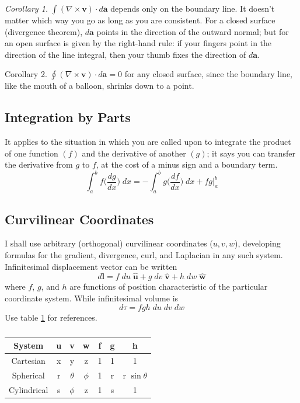 \documentclass[../main.tex]{subfiles}
\begin{document}
\emph{Corollary 1.} $\int (\nabla \times \mathbf{v})\cdot d\mathbf{a}$ depends only on the boundary line. It doesn't matter which way you go as long as you are consistent. For a closed surface (divergence theorem), $d\mathbf{a}$ points in the direction of the outward normal; but for an open surface is given by the right-hand rule: if your ﬁngers point in the direction of the line integral, then your thumb ﬁxes the direction of $d\mathbf{a}$.

Corollary 2. $\oint (\nabla \times \mathbf{v})\cdot d\mathbf{a}=0$ for any closed surface, since the boundary line, like the mouth of a balloon, shrinks down to a point.

\subsection*{Integration by Parts}
It applies to the situation in which you are called upon to integrate the product of one function $( f )$ and the derivative of another $(g)$; it says you can transfer the derivative from $g$ to $f$, at the cost of a minus sign and a boundary term.
\begin{equation*}
    \int_{a}^{b} f\bigg(\frac{dg}{dx}\bigg)\;dx=-\int_{a}^{b} g\bigg(\frac{df}{dx}\bigg)\;dx+ fg \bigg\lvert_{a}^{b}
\end{equation*}

\subsection*{Curvilinear Coordinates}
I shall use arbitrary (orthogonal) curvilinear coordinates ($u, v, w$), developing formulas for the gradient, divergence, curl, and Laplacian in any such system. Infinitesimal displacement vector can be written
\begin{equation*}
    d\mathbf{l}=f\;d u \;\mathbf{\hat{u}} +g \;d v \;\mathbf{\hat{v}}+h \;d w \;\mathbf{\hat{w}}
\end{equation*}
where $f$, $g$, and $h$ are functions of position characteristic of the particular coordinate system. While infinitesimal volume is
\begin{equation*}
    d\tau=fgh\; du \;dv \;dw
\end{equation*}
Use table \ref{T1} for references.
\begin{table}[h]
    \centering
    \begin{tabular}{c c c c c c c}
        \hline
        System&u&v&w&f&g&h\\
        \hline
        Cartesian&x&y&z&1&1&1\\
        Spherical&r&$\theta$&$\phi$&1&r&r $\sin \theta$\\
        Cylindrical&s&$\phi$&z&1&s&1\\
        \hline
    \end{tabular}
    \caption[]{}
    \label{T1}
\end{table}
\end{document}
